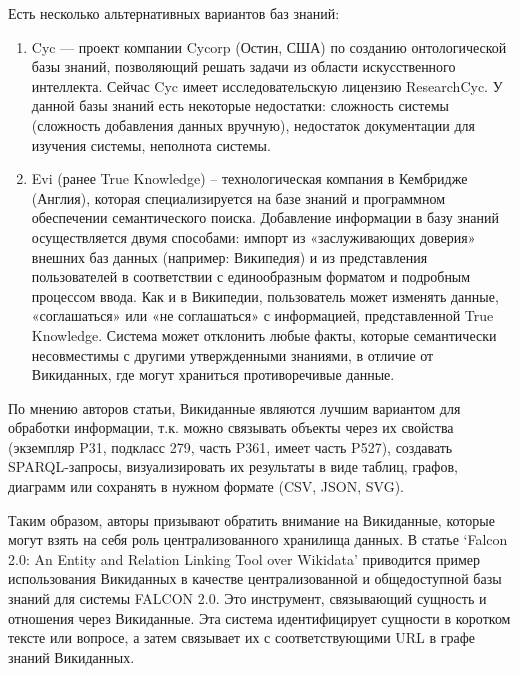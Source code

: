 Есть несколько альтернативных вариантов баз знаний:
\begin{enumerate}
\item Cyc — проект компании Cycorp (Остин, США) по созданию онтологической базы знаний, позволяющий решать задачи из области искусственного интеллекта\cite{Cyc}. Сейчас Cyc имеет исследовательскую лицензию ResearchCyc. У данной базы знаний есть некоторые недостатки: сложность системы (сложность добавления данных
вручную), недостаток документации для изучения системы, неполнота системы.
\item Evi (ранее True Knowledge\cite{True_Knowledge}) – технологическая компания в Кембридже (Англия), которая специализируется на базе знаний и программном обеспечении семантического поиска. Добавление информации в базу знаний осуществляется двумя способами: импорт из «заслуживающих доверия» внешних баз данных (например: Википедия) и из представления пользователей в соответствии с единообразным форматом и подробным процессом ввода. Как и в Википедии, пользователь может изменять
данные, «соглашаться» или «не соглашаться» с информацией, представленной True Knowledge. Система может отклонить любые факты, которые семантически несовместимы с другими утвержденными знаниями, в отличие от Викиданных, где могут
храниться противоречивые данные.
\end{enumerate}
По мнению авторов статьи, Викиданные являются лучшим вариантом для обработки информации, т.к. можно связывать объекты через их свойства (экземпляр P31, подкласс 279, часть P361, имеет часть P527), создавать SPARQL-запросы, визуализировать их результаты в виде таблиц, графов, диаграмм или сохранять в нужном формате (CSV, JSON, SVG).

Таким образом, авторы призывают обратить внимание на Викиданные, которые могут взять на себя роль централизованного хранилища данных. В статье ‘Falcon 2.0: An Entity
and Relation Linking Tool over Wikidata’ \cite{Falcon_2.0} приводится пример использования Викиданных в качестве централизованной и общедоступной базы знаний для системы FALCON 2.0. Это инструмент, связывающий сущность и отношения через Викиданные. Эта система идентифицирует сущности в коротком тексте или вопросе, а затем связывает их с соответствующими URL в графе знаний Викиданных.